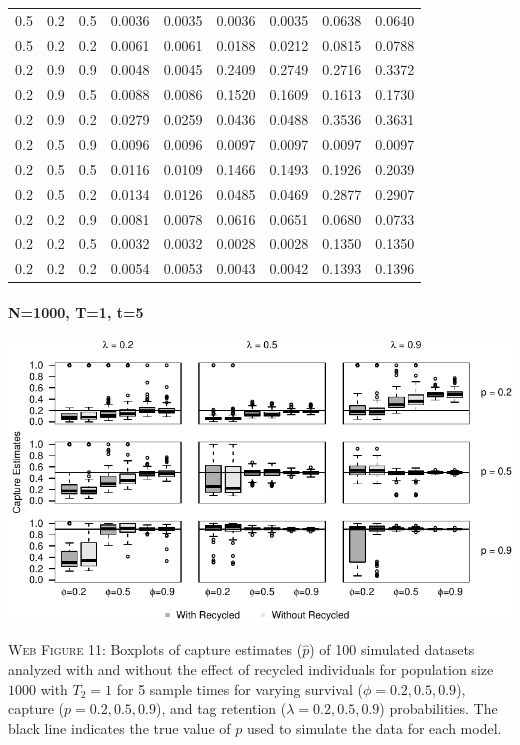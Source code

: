 \documentclass[]{article}
\let\oldparagraph\paragraph
\renewcommand{\paragraph}[1]{\oldparagraph{#1}\mbox{}}
\begin{document}
\begin{table}[ht]
{\begin{tabular}{rrrrrrrrr}
  0.5 & 0.2 & 0.5 & 0.0036 & 0.0035 & 0.0036 & 0.0035 & 0.0638 & 0.0640 \\ 
  0.5 & 0.2 & 0.2 & 0.0061 & 0.0061 & 0.0188 & 0.0212 & 0.0815 & 0.0788 \\ 
  0.2 & 0.9 & 0.9 & 0.0048 & 0.0045 & 0.2409 & 0.2749 & 0.2716 & 0.3372 \\ 
  0.2 & 0.9 & 0.5 & 0.0088 & 0.0086 & 0.1520 & 0.1609 & 0.1613 & 0.1730 \\ 
  0.2 & 0.9 & 0.2 & 0.0279 & 0.0259 & 0.0436 & 0.0488 & 0.3536 & 0.3631 \\ 
  0.2 & 0.5 & 0.9 & 0.0096 & 0.0096 & 0.0097 & 0.0097 & 0.0097 & 0.0097 \\ 
  0.2 & 0.5 & 0.5 & 0.0116 & 0.0109 & 0.1466 & 0.1493 & 0.1926 & 0.2039 \\ 
  0.2 & 0.5 & 0.2 & 0.0134 & 0.0126 & 0.0485 & 0.0469 & 0.2877 & 0.2907 \\ 
  0.2 & 0.2 & 0.9 & 0.0081 & 0.0078 & 0.0616 & 0.0651 & 0.0680 & 0.0733 \\ 
  0.2 & 0.2 & 0.5 & 0.0032 & 0.0032 & 0.0028 & 0.0028 & 0.1350 & 0.1350 \\ 
  0.2 & 0.2 & 0.2 & 0.0054 & 0.0053 & 0.0043 & 0.0042 & 0.1393 & 0.1396 \\ 
   \hline
\end{tabular}
}
\endgroup
\end{table}

\newpage

\paragraph{N=1000, T=1, t=5}\label{n1000-t1-t5-1}

\includegraphics{Appendix_BW_files/figure-latex/figure11_capture_GJSTL5-1.pdf}

\textsc{Web Figure 11:} Boxplots of capture estimates (\(\hat{p}\)) of
100 simulated datasets analyzed with and without the effect of recycled
individuals for population size \(1000\) with \(T_2=1\) for 5 sample times for varying survival (\(\phi=0.2,0.5,0.9\)), capture
(\(p=0.2,0.5,0.9\)), and tag retention (\(\lambda=0.2,0.5,0.9\))
probabilities. The black line indicates the true value of \(p\) used to
simulate the data for each model.
\end{document}
